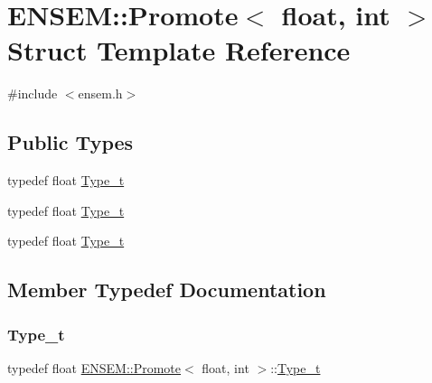\hypertarget{structENSEM_1_1Promote_3_01float_00_01int_01_4}{}\section{E\+N\+S\+EM\+:\+:Promote$<$ float, int $>$ Struct Template Reference}
\label{structENSEM_1_1Promote_3_01float_00_01int_01_4}


{\ttfamily \#include $<$ensem.\+h$>$}

\subsection*{Public Types}
\begin{DoxyCompactItemize}
\item 
typedef float \mbox{\hyperlink{structENSEM_1_1Promote_3_01float_00_01int_01_4_ac183cf99d20cafab1e283ee7435667af}{Type\+\_\+t}}
\item 
typedef float \mbox{\hyperlink{structENSEM_1_1Promote_3_01float_00_01int_01_4_ac183cf99d20cafab1e283ee7435667af}{Type\+\_\+t}}
\item 
typedef float \mbox{\hyperlink{structENSEM_1_1Promote_3_01float_00_01int_01_4_ac183cf99d20cafab1e283ee7435667af}{Type\+\_\+t}}
\end{DoxyCompactItemize}


\subsection{Member Typedef Documentation}
\mbox{\label{structENSEM_1_1Promote_3_01float_00_01int_01_4_ac183cf99d20cafab1e283ee7435667af}} 
\subsubsection{\texorpdfstring{Type\_t}{Type\_t}\hspace{0.1cm}{\footnotesize\ttfamily [1/3]}}
{\footnotesize\ttfamily typedef float \mbox{\hyperlink{structENSEM_1_1Promote}{E\+N\+S\+E\+M\+::\+Promote}}$<$ float, int $>$\+::\mbox{\hyperlink{structENSEM_1_1Promote_3_01float_00_01int_01_4_ac183cf99d20cafab1e283ee7435667af}{Type\+\_\+t}}}

\mbox{\label{structENSEM_1_1Promote_3_01float_00_01int_01_4_ac183cf99d20cafab1e283ee7435667af}} 
